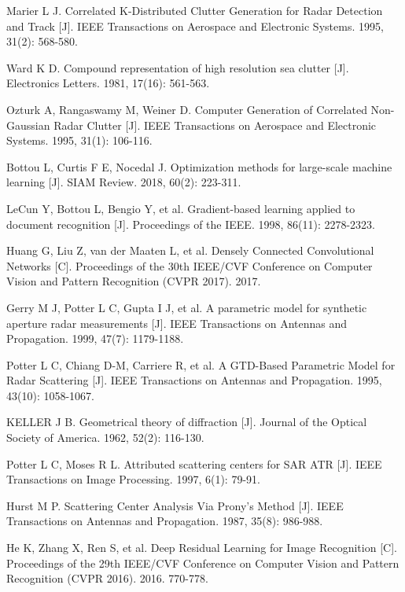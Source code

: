 \documentclass[doctor,twoside,ttf]{nudtpaper}
\begin{document}
\begin{thebibliography}{99}
 Marier L J. Correlated K-Distributed Clutter Generation for Radar Detection and Track [J]. IEEE Transactions on Aerospace and Electronic Systems. 1995, 31(2): 568-580.

 Ward K D. Compound representation of high resolution sea clutter [J]. Electronics Letters. 1981, 17(16): 561-563.

 Ozturk A, Rangaswamy M, Weiner D. Computer Generation of Correlated Non-Gaussian Radar Clutter [J]. IEEE Transactions on Aerospace and Electronic Systems. 1995, 31(1): 106-116.

 Bottou L, Curtis F E, Nocedal J. Optimization methods for large-scale machine learning [J]. SIAM Review. 2018, 60(2): 223-311.

 LeCun Y, Bottou L, Bengio Y, et al. Gradient-based learning applied to document recognition [J]. Proceedings of the IEEE. 1998, 86(11): 2278-2323.

 Huang G, Liu Z, van der Maaten L, et al. Densely Connected Convolutional Networks [C]. Proceedings of the 30th IEEE/CVF Conference on Computer Vision and Pattern Recognition (CVPR 2017). 2017.

 Gerry M J, Potter L C, Gupta I J, et al. A parametric model for synthetic aperture radar measurements [J]. IEEE Transactions on Antennas and Propagation. 1999, 47(7): 1179-1188.

 Potter L C, Chiang D-M, Carriere R, et al. A GTD-Based Parametric Model for Radar Scattering [J]. IEEE Transactions on Antennas and Propagation. 1995, 43(10): 1058-1067.

 KELLER J B. Geometrical theory of diffraction [J]. Journal of the Optical Society of America. 1962, 52(2): 116-130.

 Potter L C, Moses R L. Attributed scattering centers for SAR ATR [J]. IEEE Transactions on Image Processing. 1997, 6(1): 79-91.

 Hurst M P. Scattering Center Analysis Via Prony’s Method [J]. IEEE Transactions on Antennas and Propagation. 1987, 35(8): 986-988.

 He K, Zhang X, Ren S, et al. Deep Residual Learning for Image Recognition [C]. Proceedings of the 29th IEEE/CVF Conference on Computer Vision and Pattern Recognition (CVPR 2016). 2016. 770-778.


\end{thebibliography}
\end{document}
